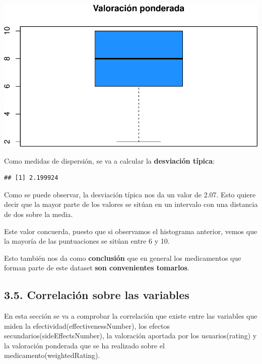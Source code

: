 \documentclass[spanish,]{article}
\newenvironment{Shaded}{\begin{snugshade}}{\end{snugshade}}
\newcommand{\KeywordTok}[1]{\textcolor[rgb]{0.13,0.29,0.53}{\textbf{#1}}}
\newcommand{\CommentTok}[1]{\textcolor[rgb]{0.56,0.35,0.01}{\textit{#1}}}
\newcommand{\OperatorTok}[1]{\textcolor[rgb]{0.81,0.36,0.00}{\textbf{#1}}}
\newcommand{\NormalTok}[1]{#1}
\begin{document}
\includegraphics{practica-original_files/figure-latex/unnamed-chunk-114-1.pdf}

Como medidas de dispersión, se va a calcular la \textbf{desviación
típica}:

\begin{Shaded}
\end{Shaded}

\begin{verbatim}
## [1] 2.199924
\end{verbatim}

Como se puede observar, la desviación típica nos da un valor de 2.07.
Esto quiere decir que la mayor parte de los valores se sitúan en un
intervalo con una distancia de dos sobre la media.

Este valor concuerda, puesto que si observamos el histograma anterior,
vemos que la mayoría de las puntuaciones se sitúan entre 6 y 10.

Esto también nos da como \textbf{conclusión} que en general los
medicamentos que forman parte de este dataset \textbf{son convenientes
tomarlos}.

\subsection{3.5. Correlación sobre las
variables}\label{correlacion-sobre-las-variables}

En esta sección se va a comprobar la correlación que existe entre las
variables que miden la efectividad(effectivenessNumber), los efectos
secundarios(sideEffectsNumber), la valoración aportada por los
usuarios(rating) y la valoración ponderada que se ha realizado sobre el
medicamento(weightedRating).
\end{document}
